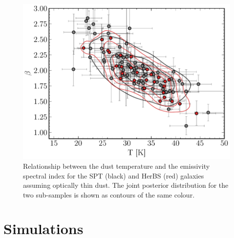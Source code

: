 \begin{figure}
	\centering
	\includegraphics[width=0.8\columnwidth]{Figures/Figure_4_7.pdf}
	\caption[Relationship between $\beta$ and $T_\textrm{dust}$ for SPT and HerBS galaxies]{Relationship between the dust temperature and the emissivity spectral index for the SPT (black) and HerBS (red) galaxies assuming optically thin dust. The joint posterior distribution for the two sub-samples is shown as contours of the same colour.}
	\label{fig:beta_t_correlation}
\end{figure}

\section{Simulations}
\label{sec:simulations}

